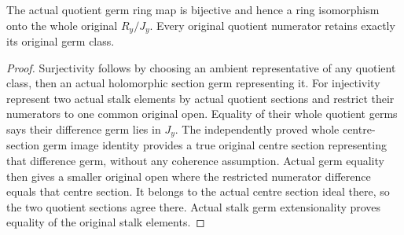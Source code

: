 \begin{theorem}
\label{hir:real-domain-actual-centre-ring-whole-presheaf-stalk}
\leanok
The actual quotient germ ring map is bijective and hence a ring
isomorphism onto the whole original $R_y/J_y$. Every original quotient
numerator retains exactly its original germ class.
\end{theorem}
\begin{proof}
Surjectivity follows by choosing an ambient representative of any
quotient class, then an actual holomorphic section germ representing it.
For injectivity represent two actual stalk elements by actual quotient
sections and restrict their numerators to one common original open.
Equality of their whole quotient germs says their difference germ lies
in $J_y$. The independently proved whole centre-section germ image
identity provides a true original centre section representing that
difference germ, without any coherence assumption. Actual germ equality
then gives a smaller original open where the restricted numerator
difference equals that centre section. It belongs to the actual centre
section ideal there, so the two quotient sections agree there. Actual
stalk germ extensionality proves equality of the original stalk elements.
\end{proof}

